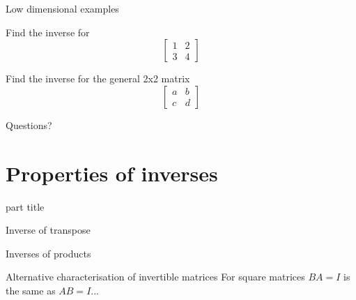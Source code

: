 \documentclass{beamer}
\begin{document}
\begin{frame}{Low dimensional examples}
  \begin{example}
    Find the inverse for
    \begin{equation*}
      \left[
        \begin{array}{cc}
          1&2\\
          3&4
        \end{array}
      \right]
    \end{equation*}
  \end{example}
  \begin{example}
    Find the inverse for the general 2x2 matrix
    \begin{equation*}
      \left[
        \begin{array}{cc}
          a&b\\
          c&d
        \end{array}
      \right]
    \end{equation*}
  \end{example}
\end{frame}

\begin{frame}
  Questions?
\end{frame}

\section{Properties of inverses}

\begin{frame}
  \begin{beamercolorbox}[sep=12pt,center]{part title}
    \insertsection\par
  \end{beamercolorbox}
\end{frame}

\begin{frame}{Inverse of transpose}
  
\end{frame}

\begin{frame}{Inverses of products}
  
\end{frame}

\begin{frame}{Alternative characterisation of invertible matrices}
  For square matrices $BA=I$ is the same as $AB=I$...
\end{frame}
\end{document}
